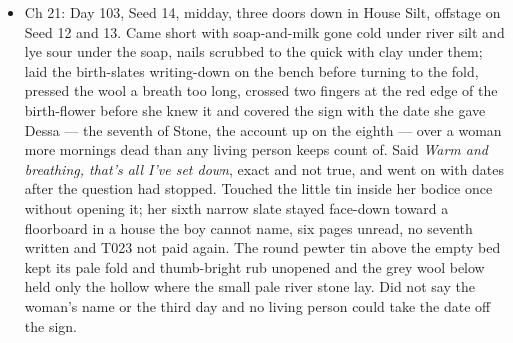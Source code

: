 \documentclass{design/chronicle}
\begin{document}
{\begin{itemize}[leftmargin=1.4em,itemsep=1pt,topsep=3pt,parsep=0pt]
\end{itemize}

\begin{itemize}[leftmargin=1.4em,itemsep=1pt,topsep=3pt,parsep=0pt]

\item Ch 21: Day 103, Seed 14, midday, three doors down in House Silt, offstage on Seed 12 and 13. Came short with soap-and-milk gone cold under river silt and lye sour under the soap, nails scrubbed to the quick with clay under them; laid the birth-slates writing-down on the bench before turning to the fold, pressed the wool a breath too long, crossed two fingers at the red edge of the birth-flower before she knew it and covered the sign with the date she gave Dessa — the seventh of Stone, the account up on the eighth — over a woman more mornings dead than any living person keeps count of. Said \emph{Warm and breathing, that’s all I’ve set down}, exact and not true, and went on with dates after the question had stopped. Touched the little tin inside her bodice once without opening it; her sixth narrow slate stayed face-down toward a floorboard in a house the boy cannot name, six pages unread, no seventh written and T023 not paid again. The round pewter tin above the empty bed kept its pale fold and thumb-bright rub unopened and the grey wool below held only the hollow where the small pale river stone lay. Did not say the woman’s name or the third day and no living person could take the date off the sign.

\end{itemize}

\begin{itemize}[leftmargin=1.4em,itemsep=1pt,topsep=3pt,parsep=0pt]


\end{itemize}}
\end{document}
